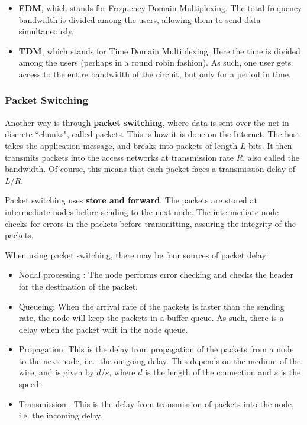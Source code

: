 \documentclass[12pt,letterpaper]{article}
\theoremstyle{definition}
\begin{document}
\begin{itemize}
  \item \textbf{FDM}, which stands for Frequency Domain Multiplexing. The total frequency bandwidth is divided among the users, allowing them to send data simultaneously. 
  \item \textbf{TDM}, which stands for Time Domain Multiplexing. Here the time is divided among the users (perhaps in a round robin fashion). As such, one user gets access to the entire bandwidth of the circuit, but only for a period in time.
\end{itemize}

\subsubsection{Packet Switching}

Another way is through \textbf{packet switching}, where data is sent over the net in discrete ``chunks", called packets. This is how it is done on the Internet. The host takes the application message, and breaks into packets of length $L$ bits. It then transmits packets into the access networks at transmission rate $R$, also called the bandwidth. Of course, this means that each packet faces a transmission delay of $L/R$.

Packet switching uses \textbf{store and forward}. The packets are stored at intermediate nodes before sending to the next node. The intermediate node checks for errors in the packets before transmitting, assuring the integrity of the packets.

When using packet switching, there may be four sources of packet delay:

\begin{itemize}
  \item Nodal processing : The node performs error checking and checks the header for the destination of the packet.
  \item Queueing: When the arrival rate of the packets is faster than the sending rate, the node will keep the packets in a buffer queue. As such, there is a delay when the packet wait in the node queue.
  \item Propagation: This is the delay from propagation of the packets from a node to the next node, i.e., the outgoing delay. This depends on the medium of the wire, and is given by $d/s$, where $d$ is the length of the connection and $s$ is the speed.
  \item Transmission : This is the delay from transmission of packets into the node, i.e. the incoming delay.
\end{itemize}
\end{document}
